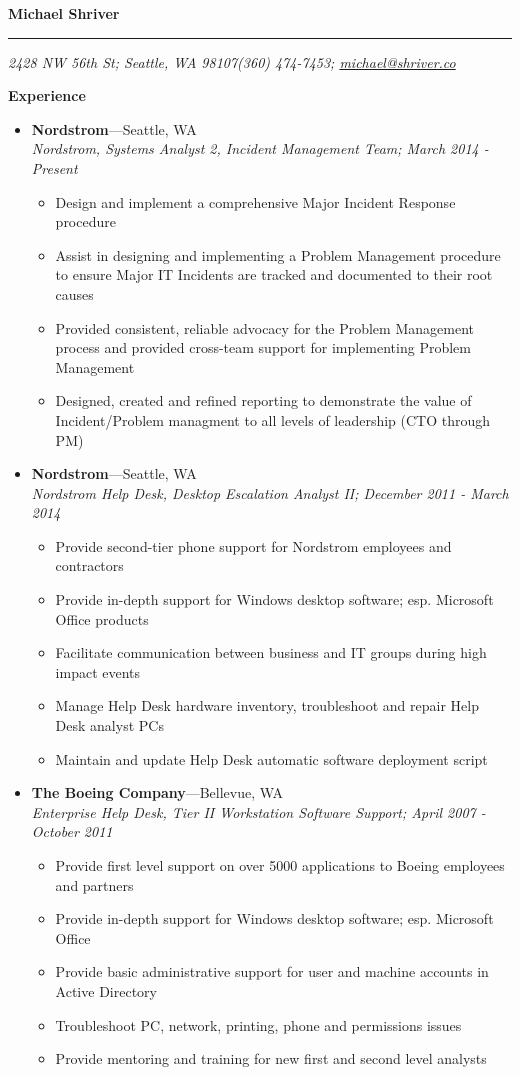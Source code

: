 \documentclass[10pt,oneside]{article}
\makeatletter
\newcommand{\name}{Michael Shriver}
\newcommand{\addr}{2428 NW 56th St; Seattle, WA  98107}
\newcommand{\phone}{(360) 474-7453}
\newcommand{\email}{\href{mailto:michael@shriver.co}{michael@shriver.co}}
\newcommand{\bigname}[1]{
    \begin{flushleft}\Huge\textbf{#1}\end{flushleft}
}
\newenvironment{ressection}[1]{
    \vspace{4pt}
    {\Large\textbf{#1}}
    \begin{itemize}
    \vspace{3pt}
}{
    \end{itemize}
}
\newcommand{\ressubitem}[1]{
    \vspace{-2pt}
    \item \begin{flushleft} #1 \end{flushleft}
}
\newcommand{\resbigitem}[3]{
    \vspace{-5pt}
    \item
    \textbf{#1}---#2 \\
    \textit{#3}
}
\newenvironment{ressubsec}[3]{
    \resbigitem{#1}{#2}{#3}
    \vspace{-1pt}
    \begin{itemize}
}{
    \end{itemize}
}
\makeatother
\begin{document}
\bigname{\name}

\vspace{-8pt} \rule{\textwidth}{1pt}

\vspace{-1pt} {\small\itshape \addr \hfill \phone; \email}

\vspace{8 pt}


\begin{ressection}{Experience}

   \begin{ressubsec}{Nordstrom}{Seattle, WA}{Nordstrom, Systems Analyst 2, Incident Management Team; March 2014 - Present}
        \ressubitem{Design and implement a comprehensive Major Incident Response procedure}
        \ressubitem{Assist in designing and implementing a Problem Management procedure to ensure Major IT Incidents are tracked and documented to their root causes}
        \ressubitem{Provided consistent, reliable advocacy for the Problem Management process and provided cross-team support for implementing Problem Management}
        \ressubitem{Designed, created and refined reporting to demonstrate the value of Incident/Problem managment to all levels of leadership (CTO through PM)}
    \end{ressubsec}

    \begin{ressubsec}{Nordstrom}{Seattle, WA}{Nordstrom Help Desk, Desktop Escalation Analyst II; December 2011 - March 2014}
        \ressubitem{Provide second-tier phone support for Nordstrom employees and contractors}
        \ressubitem{Provide in-depth support for Windows desktop software; esp. Microsoft Office products}
        \ressubitem{Facilitate communication between business and IT groups during high impact events}
        \ressubitem{Manage Help Desk hardware inventory, troubleshoot and repair Help Desk analyst PCs}
        \ressubitem{Maintain and update Help Desk automatic software deployment script}
    \end{ressubsec}

    \begin{ressubsec}{The Boeing Company}{Bellevue, WA}{Enterprise Help Desk, Tier II Workstation Software Support; April 2007 - October 2011}
        \ressubitem{Provide first level support on over 5000 applications to Boeing employees and partners}
        \ressubitem{Provide in-depth support for Windows desktop software; esp. Microsoft Office}
        \ressubitem{Provide basic administrative support for user and machine accounts in Active Directory}
        \ressubitem{Troubleshoot PC, network, printing, phone and permissions issues}
        \ressubitem{Provide mentoring and training for new first and second level analysts}
    \end{ressubsec}


\end{ressection}
\end{document}

